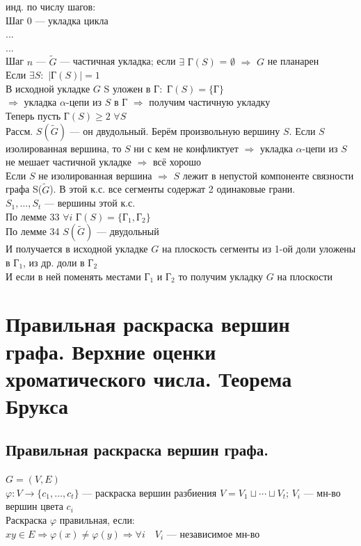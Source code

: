 \documentclass[12pt]{article}
\begin{document}
		инд. по числу шагов:\\
		Шаг 0 — укладка цикла\\
		...\\
		...\\
		Шаг $n$ — $\widetilde{G}$ — частичная укладка; если $\exists$ $Г(S)$ = $\emptyset$ $\Rightarrow$ $G$ не планарен\\
		Если $\exists S:$ $|Г(S)| = 1$\\
		В исходной укладке $G$ S уложен в $Г:$ $Г(S) = \{Г\}$\\ $\Rightarrow$ укладка $\alpha$-цепи из $S$ в $Г$ $\Rightarrow$ получим частичную укладку\\
		Теперь пусть $Г(S) \geqslant 2$ $\forall S$\\
		Рассм. $S(\widetilde{G})$ — он двудольный. Берём произвольную вершину $S$. Если $S$ изолированная вершина, то $S$ ни с кем не конфликтует $\Rightarrow$ укладка $\alpha$-цепи из $S$ не мешает частичной укладке $\Rightarrow$ всё хорошо\\
		Если $S$ не изолированная вершина $\Rightarrow$ $S$ лежит в непустой компоненте связности графа S($\widetilde{G}$). В этой к.с. все сегменты содержат 2 одинаковые грани.\\
		$S_1,\dotsc,S_t$ — вершины этой к.с.\\
		По лемме 33 $\forall i$ $Г(S) = \{Г_1, Г_2\}$\\
		По лемме 34 $S(\widetilde{G})$ — двудольный\\
		И получается в исходной укладке $G$ на плоскость сегменты из 1-ой доли уложены в $Г_1$, из др. доли в $Г_2$\\
		И если в ней поменять местами $Г_1$ и $Г_2$ то получим укладку $G$ на плоскости\\
	\qedsymbol
\section{Правильная раскраска вершин графа. Верхние оценки хроматического числа. Теорема Брукса }
\subsection{Правильная раскраска вершин графа.}
	$G = (V,E)$\\
	$\varphi:V \to \{c_1,\dotsc,c_t\}$ — раскраска вершин разбиения $V = V_1 \sqcup \dotsb \sqcup V_t$; $V_i$ — мн-во вершин цвета $c_i$\\
	Раскраска $\varphi$ правильная, если:\\
	$xy \in E \Rightarrow \varphi(x) \neq \varphi(y) \Rightarrow \forall i \quad V_i$ — независимое мн-во
\end{document}
